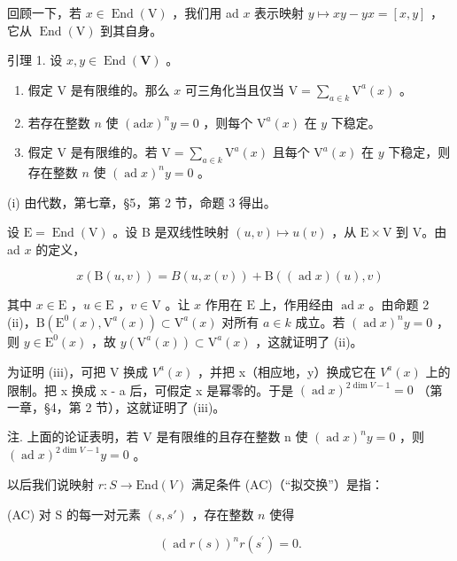 回顾一下，若 \(x \in \operatorname{End}(\mathrm{V})\) ，我们用 ad \(x\) 表示映射 \(y \mapsto xy - yx = [x, y]\) ，它从 \(\operatorname{End}(\mathrm{V})\) 到其自身。

引理 1. 设 \(x, y \in \operatorname{End}(\mathbf{V})\) 。

\begin{enumerate}
\def\labelenumi{(\roman{enumi})}
\item
  假定 \(\mathrm{V}\) 是有限维的。那么 \(x\) 可三角化当且仅当 \(\mathrm{V} = \sum_{a\in k}\mathrm{V}^a (x)\) 。
\item
  若存在整数 \(n\) 使 \((\mathrm{ad}x)^n y = 0\) ，则每个 \(\mathrm{V}^a(x)\) 在 \(y\) 下稳定。
\item
  假定 \(\mathrm{V}\) 是有限维的。若 \(\mathrm{V} = \sum_{a \in k} \mathrm{V}^a(x)\) 且每个 \(\mathrm{V}^a(x)\) 在 \(y\) 下稳定，则存在整数 \(n\) 使 \((\operatorname{ad} x)^n y = 0\) 。
\end{enumerate}

(i) 由代数，第七章，§5，第 2 节，命题 3 得出。

设 \(\mathrm{E} = \operatorname{End}(\mathrm{V})\) 。设 B 是双线性映射 \((u, v) \mapsto u(v)\) ，从 \(\mathrm{E} \times \mathrm{V}\) 到 V。由 ad \(x\) 的定义，

\[
x (\mathrm{B} (u, v)) = B (u, x (v)) + \mathrm{B} ((\operatorname{ad} x) (u), v)
\]

其中 \(x \in \mathrm{E}\) ，\(u \in \mathrm{E}\) ，\(v \in \mathrm{V}\) 。让 \(x\) 作用在 \(\mathrm{E}\) 上，作用经由 \(\operatorname{ad} x\) 。由命题 2 (ii)，\(\mathrm{B}(\mathrm{E}^0(x), \mathrm{V}^a(x)) \subset \mathrm{V}^a(x)\) 对所有 \(a \in k\) 成立。若 \((\operatorname{ad} x)^n y = 0\) ，则 \(y \in \mathrm{E}^0(x)\) ，故 \(y(\mathrm{V}^a(x)) \subset \mathrm{V}^a(x)\) ，这就证明了 (ii)。

为证明 (iii)，可把 V 换成 \(V^{a}(x)\) ，并把 x（相应地，y）换成它在 \(V^{a}(x)\) 上的限制。把 x 换成 x - a 后，可假定 x 是幂零的。于是 \((\operatorname{ad} x)^{2\dim V-1} = 0\) （第一章，§4，第 2 节），这就证明了 (iii)。

注. 上面的论证表明，若 V 是有限维的且存在整数 n 使 \((\operatorname{ad} x)^{n}y = 0\) ，则 \((\operatorname{ad} x)^{2\dim V-1}y = 0\) 。

以后我们说映射 \(r : S \to \text{End}(V)\) 满足条件 (AC)（“拟交换”）是指：

(AC) 对 S 的每一对元素 \((s, s')\) ，存在整数 \(n\) 使得

\[
(\operatorname{ad} r (s)) ^ {n} r \left(s ^ {\prime}\right) = 0.
\]

